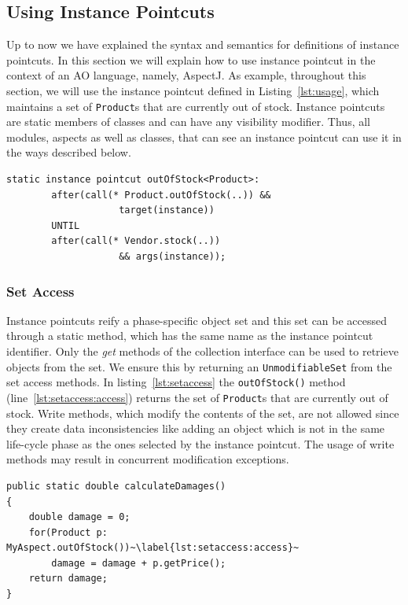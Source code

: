 \documentclass[10pt]{sigplanconf}
\newcommand{\lstinln}[1]{\lstinline~#1~}
\begin{document}
\subsection{Using Instance Pointcuts}
Up to now we have explained the syntax and semantics for definitions of instance pointcuts.
In this section we will explain how to use instance pointcut in the context of an AO language, namely, AspectJ.
As example, throughout this section, we will use the instance pointcut defined in Listing~\ref{lst:usage}, which maintains a set of \lstinln{Product}s that are currently out of stock.
Instance pointcuts are static members of classes and can have any visibility modifier.
Thus, all modules, aspects as well as classes, that can see an instance pointcut can use it in the ways described below.

\begin{lstlisting}[float=h!, caption={An instance pointcut for out of stock products}, label={lst:usage}]
	static instance pointcut outOfStock<Product>:
		after(call(* Product.outOfStock(..)) &&
					target(instance))
		UNTIL
		after(call(* Vendor.stock(..))
					&& args(instance));
\end{lstlisting}

\subsubsection{Set Access}
Instance pointcuts reify a phase-specific object set and this set can be accessed through a static method, which has the same name as the instance pointcut identifier. Only the \emph{get} methods of the collection interface can be used to retrieve objects from the set. We ensure this by returning an \lstinln{UnmodifiableSet} from the set access methods. In listing~\ref{lst:setaccess} the \lstinln{outOfStock()} method (line~\ref{lst:setaccess:access}) returns the set of \lstinln{Product}s that are currently out of stock. Write methods, which modify the contents of the set, are not allowed since they create data inconsistencies like adding an object which is not in the same life-cycle phase as the ones selected by the instance pointcut. The usage of write methods may result in concurrent modification exceptions.


\begin{lstlisting}[float=h!, caption={Calculate a damage estimate for out of stock products}, label={lst:setaccess}]
public static double calculateDamages()
{
	double damage = 0;
	for(Product p: MyAspect.outOfStock())~\label{lst:setaccess:access}~
		damage = damage + p.getPrice();
	return damage;
}
\end{lstlisting}
\end{document}
